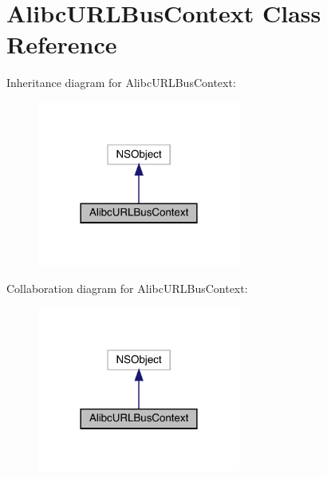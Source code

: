 \hypertarget{interface_alibc_u_r_l_bus_context}{}\section{Alibc\+U\+R\+L\+Bus\+Context Class Reference}
\label{interface_alibc_u_r_l_bus_context}


Inheritance diagram for Alibc\+U\+R\+L\+Bus\+Context\+:\nopagebreak
\begin{figure}[H]
\begin{center}
\leavevmode
\includegraphics[width=189pt]{interface_alibc_u_r_l_bus_context__inherit__graph}
\end{center}
\end{figure}


Collaboration diagram for Alibc\+U\+R\+L\+Bus\+Context\+:\nopagebreak
\begin{figure}[H]
\begin{center}
\leavevmode
\includegraphics[width=189pt]{interface_alibc_u_r_l_bus_context__coll__graph}
\end{center}
\end{figure}
